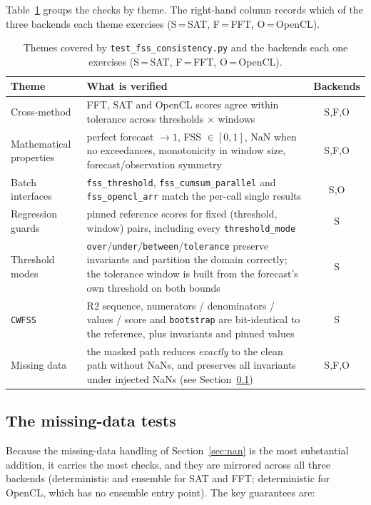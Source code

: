 Table~\ref{tab:tests} groups the checks by theme. The right-hand column records
which of the three backends each theme exercises (S\,=\,SAT, F\,=\,FFT,
O\,=\,OpenCL).

\begin{table}[ht!]
\centering
\renewcommand{\arraystretch}{1.25}
\begin{tabularx}{\textwidth}{l X c}
\toprule
\textbf{Theme} & \textbf{What is verified} & \textbf{Backends} \\
\midrule
Cross-method
  & FFT, SAT and OpenCL scores agree within tolerance across thresholds
    $\times$ windows & S,F,O \\
Mathematical properties
  & perfect forecast $\to 1$, FSS $\in [0,1]$, NaN when no exceedances,
    monotonicity in window size, forecast/observation symmetry & S,F,O \\
Batch interfaces
  & \texttt{fss\_threshold}, \texttt{fss\_cumsum\_parallel} and
    \texttt{fss\_opencl\_arr} match the per-call single results & S,O \\
Regression guards
  & pinned reference scores for fixed (threshold, window) pairs, including
    every \texttt{threshold\_mode} & S \\
Threshold modes
  & \texttt{over}/\texttt{under}/\texttt{between}/\texttt{tolerance} preserve
    invariants and partition the domain correctly; the tolerance window is
    built from the forecast's own threshold on both bounds & S \\
\texttt{CWFSS}
  & R2 sequence, numerators / denominators / values / score and
    \texttt{bootstrap} are bit-identical to the reference, plus invariants
    and pinned values & S \\
Missing data
  & the masked path reduces \emph{exactly} to the clean path without NaNs, and
    preserves all invariants under injected NaNs (see
    Section~\ref{sec:tests-nan}) & S,F,O \\
\bottomrule
\end{tabularx}
\caption{Themes covered by \texttt{test\_fss\_consistency.py} and the backends
each one exercises (S\,=\,SAT, F\,=\,FFT, O\,=\,OpenCL).}
\label{tab:tests}
\end{table}

\subsection{The missing-data tests}
\label{sec:tests-nan}

Because the missing-data handling of Section~\ref{sec:nan} is the most
substantial addition, it carries the most checks, and they are mirrored across
all three backends (deterministic and ensemble for SAT and FFT; deterministic
for OpenCL, which has no ensemble entry point). The key guarantees are:

